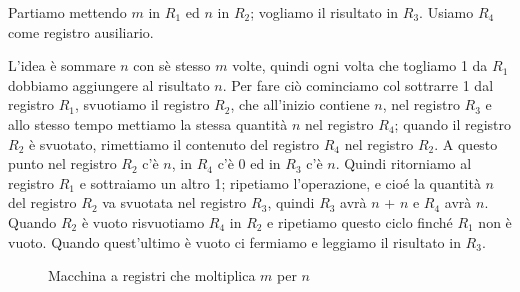 \begin{esempio}
    Partiamo mettendo \( m \) in \( R_1 \) ed \( n \) in \( R_2 \);
    vogliamo il risultato in \( R_3 \). Usiamo \( R_4 \) come registro
    ausiliario.

    L'idea \`e sommare \( n \) con s\`e stesso \( m \) volte, quindi
    ogni volta che togliamo 1 da \( R_1 \) dobbiamo aggiungere al
    risultato \( n \). Per fare ci\`o cominciamo col sottrarre 1 dal
    registro \( R_1 \), svuotiamo il registro \( R_2 \), che
    all'inizio contiene \( n \), nel registro \( R_3 \) e allo stesso
    tempo mettiamo la stessa quantit\`a \( n \) nel registro \( R_4
\); quando il registro \( R_2 \) \`e svuotato, rimettiamo il
    contenuto del registro \( R_4 \) nel registro \( R_2 \). A questo
    punto nel registro \( R_2 \) c'\`e \( n \), in \( R_4 \) c'\`e 0
    ed in \( R_3 \) c'\`e \( n \). Quindi ritorniamo al registro \(
R_1 \) e sottraiamo un altro 1; ripetiamo l'operazione, e cio\'e
    la quantit\`a \( n \) del registro \( R_2 \) va svuotata nel
    registro \( R_3 \), quindi \( R_3 \) avr\`a \( n \) + \( n \) e \(
R_4 \) avr\`a \( n \). Quando \( R_2 \) \`e vuoto risvuotiamo \(
R_4 \) in \( R_2 \) e ripetiamo questo ciclo finch\'e \( R_1 \)
    non \`e vuoto. Quando quest'ultimo \`e vuoto ci fermiamo e
    leggiamo il risultato in \( R_3 \).

    \begin{figure}[hbtp]
    \hspace{0cm}
    \caption{Macchina a registri che moltiplica \( m \) per \( n \)}
    \end{figure}

\end{esempio}

